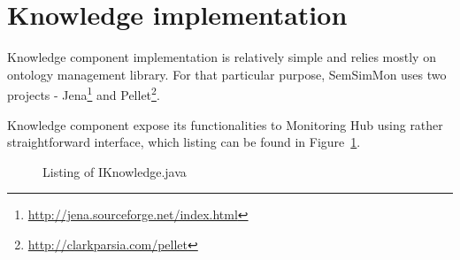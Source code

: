 \section{Knowledge implementation}

Knowledge component implementation is relatively simple and relies mostly on ontology management library. For that particular purpose, SemSimMon uses two projects - Jena\footnote{\url{http://jena.sourceforge.net/index.html}} and Pellet\footnote{\url{http://clarkparsia.com/pellet}}. 

Knowledge component expose its functionalities to Monitoring Hub using rather straightforward interface, which listing can be found in Figure~\ref{fig:iknowledge_java}.

\begin{figure}[ht]
  \centering
  
  \caption{Listing of IKnowledge.java}
  \label{fig:iknowledge_java}
\end{figure} 
